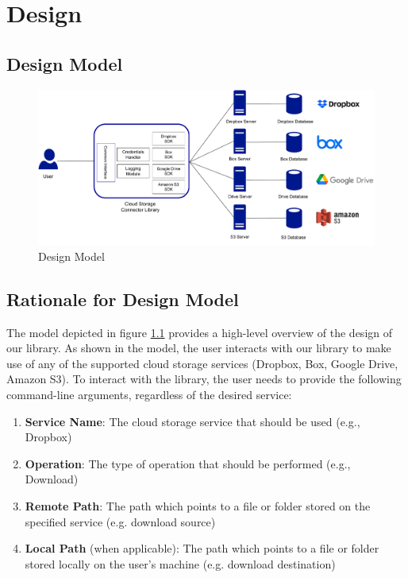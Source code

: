 \chapter{Design}\label{ch:design}

\section{Design Model}

\begin{figure} [h]
    \centering
    \includegraphics[scale=0.55]{images/design_diagram}
    \caption{\label{fig:design_model}Design Model}
\end{figure}

\section{Rationale for Design Model}
The model depicted in figure \ref{fig:design_model} provides a high-level overview of the design of our library. As shown in the model, the user interacts with our library to make use of any of the supported cloud storage services (Dropbox, Box, Google Drive, Amazon S3). To interact with the library, the user needs to provide the following command-line arguments, regardless of the desired service:

\begin{enumerate}
    \item \textbf{Service Name}: The cloud storage service that should be used (e.g., Dropbox)

    \item \textbf{Operation}: The type of operation that should be performed (e.g., Download)

    \item \textbf{Remote Path}: The path which points to a file or folder stored on the specified service (e.g. download source)

    \item \textbf{Local Path} (when applicable): The path which points to a file or folder stored locally on the user's machine (e.g. download destination)
\end{enumerate}

